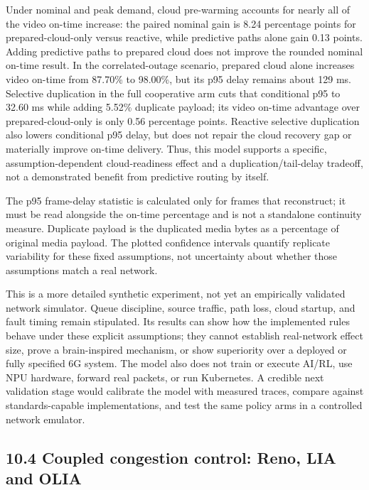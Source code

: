 \documentclass[
  american,
  11pt,
]{article}
\begin{document}
Under nominal and peak demand, cloud pre-warming accounts for nearly all
of the video on-time increase: the paired nominal gain is 8.24
percentage points for prepared-cloud-only versus reactive, while
predictive paths alone gain 0.13 points. Adding predictive paths to
prepared cloud does not improve the rounded nominal on-time result. In
the correlated-outage scenario, prepared cloud alone increases video
on-time from 87.70\% to 98.00\%, but its p95 delay remains about 129 ms.
Selective duplication in the full cooperative arm cuts that conditional
p95 to 32.60 ms while adding 5.52\% duplicate payload; its video on-time
advantage over prepared-cloud-only is only 0.56 percentage points.
Reactive selective duplication also lowers conditional p95 delay, but
does not repair the cloud recovery gap or materially improve on-time
delivery. Thus, this model supports a specific, assumption-dependent
cloud-readiness effect and a duplication/tail-delay tradeoff, not a
demonstrated benefit from predictive routing by itself.

The p95 frame-delay statistic is calculated only for frames that
reconstruct; it must be read alongside the on-time percentage and is not
a standalone continuity measure. Duplicate payload is the duplicated
media bytes as a percentage of original media payload. The plotted
confidence intervals quantify replicate variability for these fixed
assumptions, not uncertainty about whether those assumptions match a
real network.

This is a more detailed synthetic experiment, not yet an empirically
validated network simulator. Queue discipline, source traffic, path
loss, cloud startup, and fault timing remain stipulated. Its results can
show how the implemented rules behave under these explicit assumptions;
they cannot establish real-network effect size, prove a brain-inspired
mechanism, or show superiority over a deployed or fully specified 6G
system. The model also does not train or execute AI/RL, use NPU
hardware, forward real packets, or run Kubernetes. A credible next
validation stage would calibrate the model with measured traces, compare
against standards-capable implementations, and test the same policy arms
in a controlled network emulator.

\subsection{10.4 Coupled congestion control: Reno, LIA and
OLIA}\label{coupled-congestion-control-reno-lia-and-olia}
\end{document}
